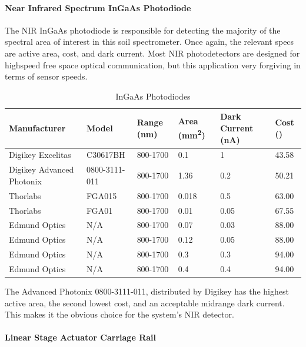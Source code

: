 \paragraph{Near Infrared Spectrum InGaAs Photodiode}

The NIR InGaAs photodiode is responsible for detecting the majority of the spectral area of interest in this soil spectrometer. Once again, the relevant specs are active area, cost, and dark current. Most NIR photodetectors are designed for highspeed free space optical communication, but this application very forgiving in terms of sensor speeds. 


\begin{table}[H]
	\centering
	\label{table:InGaAsPhotodiodes}
	\caption{InGaAs Photodiodes}
	\bigskip
	\begin{tabular}{|p{3cm}|p{2cm}|p{2cm}|p{1.5cm}|p{1.5cm}|p{1.5cm}|}
	\hline
	Manufacturer & Model & Range (nm) & Area (mm\textsuperscript{2}) & Dark Current (nA) & Cost (\textdollar)\\
	\hline
	Digikey Excelitas & C30617BH & 800-1700 & 0.1 & 1 & 43.58\\
	\hline
	Digikey Advanced Photonix & 0800-3111-011 & 800-1700 & 1.36 & 0.2 & 50.21\\
	\hline
	Thorlabs & FGA015 & 800-1700 & 0.018 & 0.5 & 63.00\\
	\hline
	Thorlabs & FGA01 & 800-1700 & 0.01 & 0.05 & 67.55\\
	\hline
	Edmund Optics & N/A & 800-1700 & 0.07 & 0.03 & 88.00\\
	\hline
	Edmund Optics & N/A & 800-1700 & 0.12 & 0.05 & 88.00\\
	\hline
	Edmund Optics & N/A & 800-1700 & 0.3 & 0.3 & 94.00\\
	\hline
	Edmund Optics & N/A & 800-1700 & 0.4 & 0.4 & 94.00\\
	\hline
	\end{tabular}
\end{table}

The Advanced Photonix 0800-3111-011, distributed by Digikey has the highest active area, the second lowest cost, and an acceptable midrange dark current. This makes it the obvious choice for the system’s NIR detector.

\paragraph{Linear Stage Actuator Carriage Rail}

